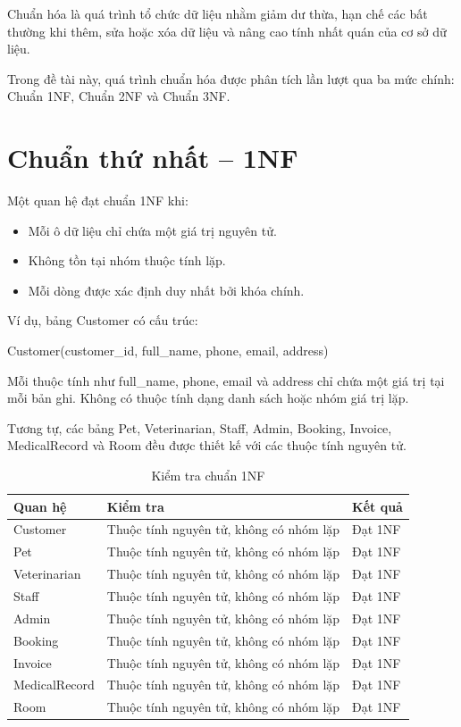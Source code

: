 Chuẩn hóa là quá trình tổ chức dữ liệu nhằm giảm dư thừa, hạn chế các bất thường khi thêm, sửa hoặc xóa dữ liệu và nâng cao tính nhất quán của cơ sở dữ liệu.

Trong đề tài này, quá trình chuẩn hóa được phân tích lần lượt qua ba mức chính: Chuẩn 1NF, Chuẩn 2NF và Chuẩn 3NF.

\section{Chuẩn thứ nhất -- 1NF}

Một quan hệ đạt chuẩn 1NF khi:

\begin{itemize}
    \item Mỗi ô dữ liệu chỉ chứa một giá trị nguyên tử.
    \item Không tồn tại nhóm thuộc tính lặp.
    \item Mỗi dòng được xác định duy nhất bởi khóa chính.
\end{itemize}

Ví dụ, bảng Customer có cấu trúc:

Customer(customer\_id, full\_name, phone, email, address)

Mỗi thuộc tính như full\_name, phone, email và address chỉ chứa một giá trị tại mỗi bản ghi. Không có thuộc tính dạng danh sách hoặc nhóm giá trị lặp.

Tương tự, các bảng Pet, Veterinarian, Staff, Admin, Booking, Invoice, MedicalRecord và Room đều được thiết kế với các thuộc tính nguyên tử.

\begin{table}[htbp]
    \centering
    \caption{Kiểm tra chuẩn 1NF}
    \label{tab:1nf}
    \begin{tabularx}{\textwidth}{|p{3cm}|X|p{3cm}|}
        \hline
        \textbf{Quan hệ} & \textbf{Kiểm tra} & \textbf{Kết quả} \\ \hline
        Customer & Thuộc tính nguyên tử, không có nhóm lặp & Đạt 1NF \\ \hline
        Pet & Thuộc tính nguyên tử, không có nhóm lặp & Đạt 1NF \\ \hline
        Veterinarian & Thuộc tính nguyên tử, không có nhóm lặp & Đạt 1NF \\ \hline
        Staff & Thuộc tính nguyên tử, không có nhóm lặp & Đạt 1NF \\ \hline
        Admin & Thuộc tính nguyên tử, không có nhóm lặp & Đạt 1NF \\ \hline
        Booking & Thuộc tính nguyên tử, không có nhóm lặp & Đạt 1NF \\ \hline
        Invoice & Thuộc tính nguyên tử, không có nhóm lặp & Đạt 1NF \\ \hline
        MedicalRecord & Thuộc tính nguyên tử, không có nhóm lặp & Đạt 1NF \\ \hline
        Room & Thuộc tính nguyên tử, không có nhóm lặp & Đạt 1NF \\ \hline
    \end{tabularx}
\end{table}

